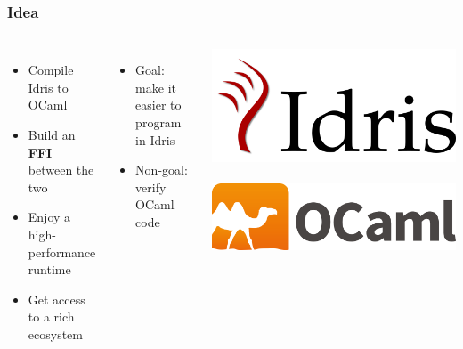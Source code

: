 \documentclass[aspectratio=169]{beamer}
\begin{document}
\begin{frame}[t]
  \frametitle{Idea}
  \begin{columns}[c]
    \begin{itemize}
      \item Compile Idris to OCaml
      \item Build an \textbf{FFI} between the two
      \item Enjoy a high-performance runtime
      \item Get access to a rich ecosystem
    \end{itemize}
    \bigskip
    \begin{itemize}
      \item Goal: make it easier to program in Idris
      \item Non-goal: verify OCaml code
    \end{itemize}
    \includegraphics[width=.5\textwidth]{logo.png}\\~\\
    \includegraphics[width=.5\textwidth]{ocamllogo.png}
  \end{columns}
\end{frame}


\end{document}
